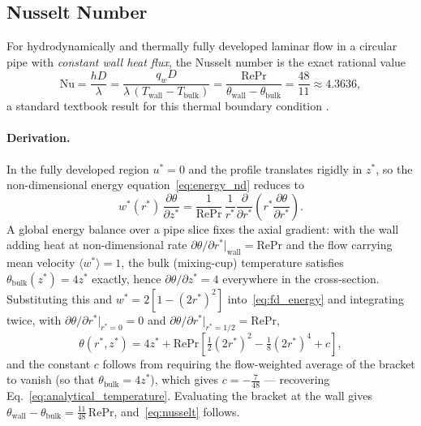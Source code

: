 \documentclass[12pt,a4paper]{article}
\newcommand{\parder}[2]{\frac{\partial #1}{\partial #2}}
\newcommand{\Rey}{\text{Re}}
\newcommand{\Pran}{\text{Pr}}
\begin{document}
\subsection{Nusselt Number}
\label{sec:nusselt-check}

For hydrodynamically and thermally fully developed laminar flow in a circular pipe with
\emph{constant wall heat flux}, the Nusselt number is the exact rational value
\begin{equation}
    \text{Nu} = \frac{h D}{\lambda} = \frac{q_w D}{\lambda\,(T_{\text{wall}} - T_{\text{bulk}})}
              = \frac{\Rey\Pran}{\theta_{\text{wall}} - \theta_{\text{bulk}}}
              = \frac{48}{11} \approx 4.3636 ,
    \label{eq:nusselt}
\end{equation}
a standard textbook result for this thermal boundary condition
\cite{ShahLondon1978,Incropera}.

\paragraph{Derivation.} In the fully developed region $u^*=0$ and the profile translates
rigidly in $z^*$, so the non-dimensional energy equation~\eqref{eq:energy_nd} reduces to
\begin{equation}
    w^*(r^*)\,\parder{\theta}{z^*}
      = \frac{1}{\Rey\Pran}\,\frac{1}{r^*}\parder{}{r^*}\!\left(r^*\parder{\theta}{r^*}\right).
    \label{eq:fd_energy}
\end{equation}
A global energy balance over a pipe slice fixes the axial gradient: with the wall adding heat at
non-dimensional rate $\partial\theta/\partial r^*|_{\text{wall}}=\Rey\Pran$ and the flow carrying
mean velocity $\langle w^*\rangle = 1$, the bulk (mixing-cup) temperature satisfies
$\theta_{\text{bulk}}(z^*) = 4z^*$ exactly, hence $\partial\theta/\partial z^* = 4$ everywhere in
the cross-section. Substituting this and $w^*=2[1-(2r^*)^2]$ into~\eqref{eq:fd_energy} and
integrating twice, with $\partial\theta/\partial r^*|_{r^*=0}=0$ and
$\partial\theta/\partial r^*|_{r^*=1/2}=\Rey\Pran$,
\begin{equation}
    \theta(r^*,z^*) = 4z^* + \Rey\Pran\left[\tfrac12(2r^*)^2 - \tfrac18(2r^*)^4 + c\right] ,
\end{equation}
and the constant $c$ follows from requiring the flow-weighted average of the bracket to vanish
(so that $\theta_{\text{bulk}}=4z^*$), which gives $c=-\tfrac{7}{48}$ --- recovering
Eq.~\eqref{eq:analytical_temperature}. Evaluating the bracket at the wall gives
$\theta_{\text{wall}}-\theta_{\text{bulk}} = \tfrac{11}{48}\,\Rey\Pran$, and~\eqref{eq:nusselt}
follows.
\end{document}
